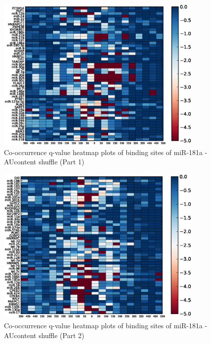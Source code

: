 \begin{figure}
   	\includegraphics[width=0.9\textwidth,clip]{appendix1/figures/miR-181a_AUcontent_expressed_heatmap_qvalues0.eps}
   	\caption{Co-occurrence q-value heatmap plots of binding sites of miR-181a - AUcontent shuffle (Part 1)}
\end{figure}
\clearpage
\begin{figure}
   	\includegraphics[width=0.9\textwidth,clip]{appendix1/figures/miR-181a_AUcontent_expressed_heatmap_qvalues1.eps}
   	\caption{Co-occurrence q-value heatmap plots of binding sites of miR-181a - AUcontent shuffle (Part 2)}
\end{figure}
